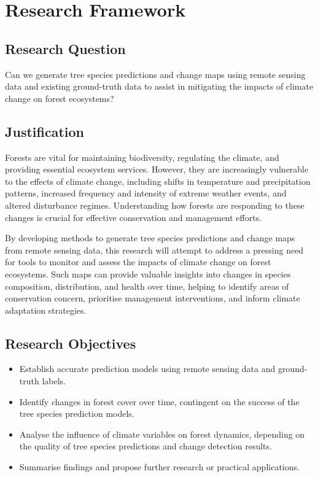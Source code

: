 \chapter{Research Framework}
\label{chapter:frame}
\section{Research Question}

Can we generate tree species predictions and change maps using remote sensing data and existing ground-truth data to assist in mitigating the impacts of climate change on forest ecosystems?

\section{Justification}

Forests are vital for maintaining biodiversity, regulating the climate, and providing essential ecosystem services. However, they are increasingly vulnerable to the effects of climate change, including shifts in temperature and precipitation patterns, increased frequency and intensity of extreme weather events, and altered disturbance regimes. Understanding how forests are responding to these changes is crucial for effective conservation and management efforts.

By developing methods to generate tree species predictions and change maps from remote sensing data, this research will attempt to address a pressing need for tools to monitor and assess the impacts of climate change on forest ecosystems. Such maps can provide valuable insights into changes in species composition, distribution, and health over time, helping to identify areas of conservation concern, prioritise management interventions, and inform climate adaptation strategies.

\section{Research Objectives}

\begin{itemize}
\item Establish accurate prediction models using remote sensing data and ground-truth labels.
\item Identify changes in forest cover over time, contingent on the success of the tree species prediction models.
\item Analyse the influence of climate variables on forest dynamics, depending on the quality of tree species predictions and change detection results.
\item Summarise findings and propose further research or practical applications.
\end{itemize}

